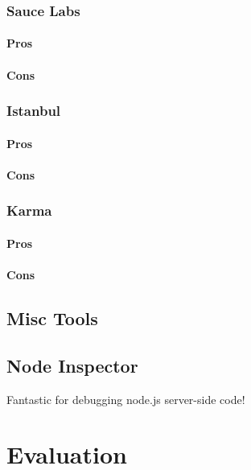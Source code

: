 \documentclass[11pt]{article}
\begin{document}
\subsubsection{Sauce Labs}

\paragraph{Pros}

\paragraph{Cons}

\subsubsection{Istanbul}

\paragraph{Pros}

\paragraph{Cons}

\subsubsection{Karma}

\paragraph{Pros}

\paragraph{Cons}


\subsection{Misc Tools}
\subsection{Node Inspector}
Fantastic for debugging node.js server-side code!


\section{Evaluation}
\end{document}
